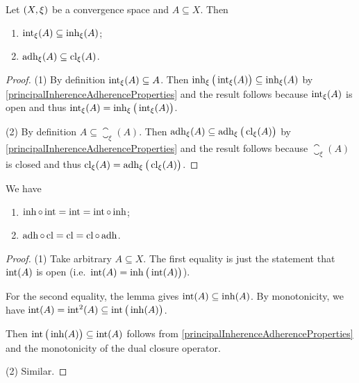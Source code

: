 \begin{lemma} \label{interiorInherenceInclusion}
Let $\sSet{X,\xi}$ be a convergence space and $A\subseteq X$. Then
\begin{enumerate}
\item $\operatorname{int}_\xi(A) \subseteq \operatorname{inh}_\xi(A)$;
\item $\operatorname{adh}_\xi(A) \subseteq \operatorname{cl}_\xi(A)$.
\end{enumerate}
\end{lemma}
\begin{proof}
(1) By definition $\operatorname{int}_\xi(A) \subseteq A$. Then $\operatorname{inh}_\xi\big(\operatorname{int}_\xi(A)\big) \subseteq \operatorname{inh}_\xi(A)$ by \ref{principalInherenceAdherenceProperties} and the result follows because $\operatorname{int}_\xi(A)$ is open and thus $\operatorname{int}_\xi(A) = \operatorname{inh}_\xi\big(\operatorname{int}_\xi(A)\big)$.

(2) By definition $A \subseteq \closure_\xi(A)$. Then $\operatorname{adh}_\xi(A) \subseteq \operatorname{adh}_\xi\big(\operatorname{cl}_\xi(A)\big)$ by \ref{principalInherenceAdherenceProperties} and the result follows because $\closure_\xi(A)$ is closed and thus $\operatorname{cl}_\xi(A) = \operatorname{adh}_\xi\big(\operatorname{cl}_\xi(A)\big)$.
\end{proof}
\begin{corollary} \label{interiorInherenceClosureAdherenceComposition}
We have
\begin{enumerate}
\item $\operatorname{inh} \circ \operatorname{int} = \operatorname{int} = \operatorname{int} \circ \operatorname{inh}$;
\item $\operatorname{adh}\circ \operatorname{cl} = \operatorname{cl} = \operatorname{cl} \circ \operatorname{adh}$.
\end{enumerate}
\end{corollary}
\begin{proof}
(1) Take arbitrary $A\subseteq X$. The first equality is just the statement that $\operatorname{int}(A)$ is open (i.e.\ $\operatorname{int}(A) = \operatorname{inh}\big(\operatorname{int}(A)\big)$).

For the second equality, the lemma gives $\operatorname{int}(A)\subseteq \operatorname{inh}(A)$. By monotonicity, we have $\operatorname{int}(A) = \operatorname{int}^2(A) \subseteq \operatorname{int}\big(\operatorname{inh}(A)\big)$.

Then $\operatorname{int}\big(\operatorname{inh}(A)\big) \subseteq \operatorname{int}(A)$ follows from \ref{principalInherenceAdherenceProperties} and the monotonicity of the dual closure operator.

(2) Similar.
\end{proof}


